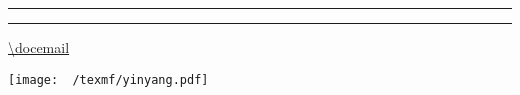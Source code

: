 \begin{titlepage}
\renewcommand{\thepage}{C1}
\begin{center}

{\color{fav-red}\rule{\textwidth}{1pt}\par\medskip}
{\huge\bfseries\sffamily \doctitle \par\medskip}
{\color{fav-red}\rule{\textwidth}{1pt}\par\medskip}

\vspace{1cm}
{\Large\sffamily \scshape \docauthor \par}
{\url{\docemail} \par}

\vspace{1cm}
{\texttt{[image: ~/texmf/yinyang.pdf]}\par}

\vfill
{\docdate \par}
{\color{fav-purple}\large\itshape \docmotto \par}

\end{center}
\end{titlepage}

\ifx \doctoc \true
{}
{\sffamily\tableofcontents}
\clearpage
{}
\fi
